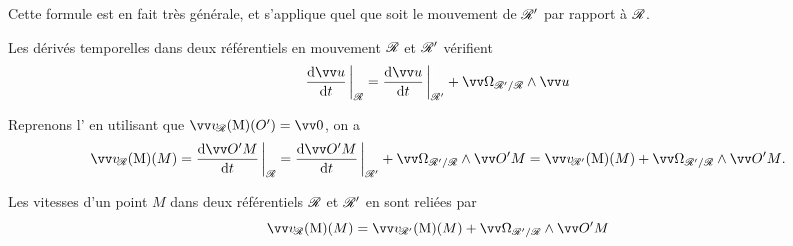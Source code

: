 \documentclass[12pt,fancy]{cours}
\begin{document}
 Cette formule est en fait très générale, et s'applique quel que soit le mouvement de $\mathcal{R}'$ par rapport à $\mathcal{R}$.


\begin{prop}\label{prop:deriv_Rrota}
Les dérivés temporelles dans deux référentiels en mouvement  $\mathcal{R}$ et $\mathcal{R}'$ vérifient
\begin{equation*}
\dR{\Vec{u}}{t}{\Rcal} = \dR{\Vec{u}}{t}{\Rcal'} + \OR \pv \Vec{u}
\end{equation*}
\end{prop}



Reprenons l' en utilisant que $\vR(O') = \Vec{0}$, on a
\begin{equation}\label{eq:relat_trans}
\vR(M)  = \dR{\Vec {O'M}}{t}{\Rcal} = \dR{\Vec {O'M}}{t}{\Rcal'} + \OR \pv \Vec {O'M} = \vRp(M) + \OR \pv \Vec {O'M}.
\end{equation}

\begin{theorem}\label{form:compov}
Les vitesses d'un point $M$ dans deux référentiels $\mathcal{R}$ et $\mathcal{R}'$ en  sont reliées par
\begin{equation*}
\vR(M) = \vRp(M) + \OR \pv \Vec {O'M}
\end{equation*}
\end{theorem}
\end{document}
